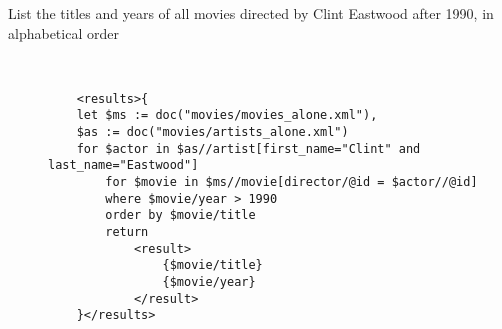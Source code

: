 \documentclass[xPath&xQuery.tex]{subfiles}
\begin{document}
\begin{description}
\item[List the titles and years of all movies directed by Clint Eastwood after 1990, in alphabetical order] \hfill \\
  \begin{verbatim}
	<results>{
	let $ms := doc("movies/movies_alone.xml"),
	$as := doc("movies/artists_alone.xml")
	for $actor in $as//artist[first_name="Clint" and last_name="Eastwood"]
	    for $movie in $ms//movie[director/@id = $actor//@id]
	    where $movie/year > 1990
	    order by $movie/title
	    return 
	        <result>
	            {$movie/title}
	            {$movie/year}
	        </result>
	}</results>
  \end{verbatim}
\end{description} 
\end{document}
